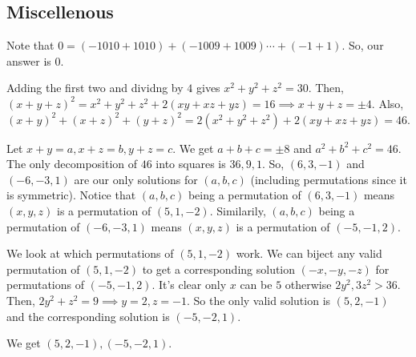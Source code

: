 \documentclass[11pt]{article}
\begin{document}
\subsection{Miscellenous}

\begin{sol}
Note that $0=(-1010+1010)+(-1009+1009)\cdots + (-1+1)$. So, our answer is $\boxed{0}$.
\end{sol}


\begin{sol} 
Adding the first two and dividng by $4$ gives $x^2+y^2+z^2=30$. Then, $(x+y+z)^2=x^2+y^2+z^2+2(xy+xz+yz)=16\implies x+y+z=\pm 4$. Also, $(x+y)^2+(x+z)^2+(y+z)^2=2(x^2+y^2+z^2)+2(xy+xz+yz)=46$. 

Let $x+y=a, x+z=b, y+z=c$. We get $a+b+c=\pm 8$ and $a^2+b^2+c^2=46$. The only decomposition of $46$ into squares is $36,9,1$. So, $(6,3,-1)$ and $(-6,-3,1)$ are our only solutions for $(a,b,c)$ (including permutations since it is symmetric). Notice that $(a,b,c)$ being a permutation of $(6,3,-1)$ means $(x,y,z)$ is a permutation of $(5,1,-2)$. Similarily, $(a,b,c)$ being a permutation of $(-6,-3,1)$ means $(x,y,z)$ is a permutation of $(-5,-1,2)$.

We look at which permutations of $(5,1,-2)$ work. We can biject any valid permutation of $(5,1,-2)$ to get a corresponding solution $(-x,-y,-z)$ for permutations of $(-5,-1,2)$. It's clear only $x$ can be $5$ otherwise $2y^2,3z^2>36$. Then, $2y^2+z^2=9\implies y=2,z=-1$. So the only valid solution is $(5,2,-1)$ and the corresponding solution is $(-5,-2,1)$.

We get $\boxed{(5,2,-1),(-5,-2,1)}$.
\end{sol}



\end{document}
